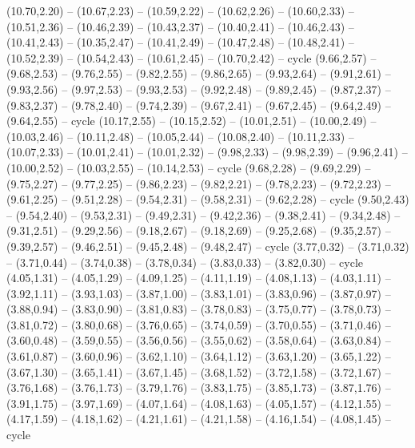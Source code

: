 \expandafter\def\csname geo:gebiet:IDN\endcsname{
  (10.70,2.20) -- (10.67,2.23) -- (10.59,2.22) -- (10.62,2.26) -- (10.60,2.33) -- (10.51,2.36) -- (10.46,2.39) -- (10.43,2.37) -- (10.40,2.41) -- (10.46,2.43) -- (10.41,2.43) -- (10.35,2.47) -- (10.41,2.49) -- (10.47,2.48) -- (10.48,2.41) -- (10.52,2.39) -- (10.54,2.43) -- (10.61,2.45) -- (10.70,2.42) -- cycle
  (9.66,2.57) -- (9.68,2.53) -- (9.76,2.55) -- (9.82,2.55) -- (9.86,2.65) -- (9.93,2.64) -- (9.91,2.61) -- (9.93,2.56) -- (9.97,2.53) -- (9.93,2.53) -- (9.92,2.48) -- (9.89,2.45) -- (9.87,2.37) -- (9.83,2.37) -- (9.78,2.40) -- (9.74,2.39) -- (9.67,2.41) -- (9.67,2.45) -- (9.64,2.49) -- (9.64,2.55) -- cycle
  (10.17,2.55) -- (10.15,2.52) -- (10.01,2.51) -- (10.00,2.49) -- (10.03,2.46) -- (10.11,2.48) -- (10.05,2.44) -- (10.08,2.40) -- (10.11,2.33) -- (10.07,2.33) -- (10.01,2.41) -- (10.01,2.32) -- (9.98,2.33) -- (9.98,2.39) -- (9.96,2.41) -- (10.00,2.52) -- (10.03,2.55) -- (10.14,2.53) -- cycle
  (9.68,2.28) -- (9.69,2.29) -- (9.75,2.27) -- (9.77,2.25) -- (9.86,2.23) -- (9.82,2.21) -- (9.78,2.23) -- (9.72,2.23) -- (9.61,2.25) -- (9.51,2.28) -- (9.54,2.31) -- (9.58,2.31) -- (9.62,2.28) -- cycle
  (9.50,2.43) -- (9.54,2.40) -- (9.53,2.31) -- (9.49,2.31) -- (9.42,2.36) -- (9.38,2.41) -- (9.34,2.48) -- (9.31,2.51) -- (9.29,2.56) -- (9.18,2.67) -- (9.18,2.69) -- (9.25,2.68) -- (9.35,2.57) -- (9.39,2.57) -- (9.46,2.51) -- (9.45,2.48) -- (9.48,2.47) -- cycle}
\expandafter\def\csname geo:gebiet:ARG\endcsname{
  (3.77,0.32) -- (3.71,0.32) -- (3.71,0.44) -- (3.74,0.38) -- (3.78,0.34) -- (3.83,0.33) -- (3.82,0.30) -- cycle
  (4.05,1.31) -- (4.05,1.29) -- (4.09,1.25) -- (4.11,1.19) -- (4.08,1.13) -- (4.03,1.11) -- (3.92,1.11) -- (3.93,1.03) -- (3.87,1.00) -- (3.83,1.01) -- (3.83,0.96) -- (3.87,0.97) -- (3.88,0.94) -- (3.83,0.90) -- (3.81,0.83) -- (3.78,0.83) -- (3.75,0.77) -- (3.78,0.73) -- (3.81,0.72) -- (3.80,0.68) -- (3.76,0.65) -- (3.74,0.59) -- (3.70,0.55) -- (3.71,0.46) -- (3.60,0.48) -- (3.59,0.55) -- (3.56,0.56) -- (3.55,0.62) -- (3.58,0.64) -- (3.63,0.84) -- (3.61,0.87) -- (3.60,0.96) -- (3.62,1.10) -- (3.64,1.12) -- (3.63,1.20) -- (3.65,1.22) -- (3.67,1.30) -- (3.65,1.41) -- (3.67,1.45) -- (3.68,1.52) -- (3.72,1.58) -- (3.72,1.67) -- (3.76,1.68) -- (3.76,1.73) -- (3.79,1.76) -- (3.83,1.75) -- (3.85,1.73) -- (3.87,1.76) -- (3.91,1.75) -- (3.97,1.69) -- (4.07,1.64) -- (4.08,1.63) -- (4.05,1.57) -- (4.12,1.55) -- (4.17,1.59) -- (4.18,1.62) -- (4.21,1.61) -- (4.21,1.58) -- (4.16,1.54) -- (4.08,1.45) -- cycle}
